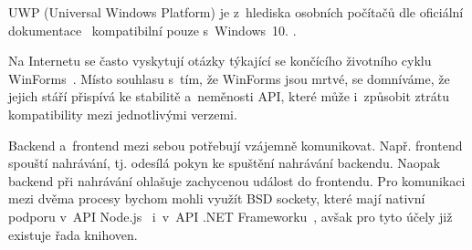 \documentclass[12pt, a4paper, twoside]{article}
\begin{document}
\begin{enumerate}[leftmargin=*]
{			UWP (Universal Windows Platform) je z~hlediska osobních počítačů dle oficiální dokumentace~\cite{uwpSupportedPlatforms} kompatibilní pouze s~Windows~10.
		}. 
		
		
		Na Internetu se často vyskytují otázky týkající se končícího životního cyklu WinForms~\cite{winformObselote1,winformsObselote2,winformsObselote3, winformsObselote4, winformsObselote5}. Místo souhlasu s~tím, že WinForms jsou mrtvé, se domníváme, že jejich stáří přispívá ke stabilitě a~neměnosti API, které může i~způsobit ztrátu kompatibility mezi jednotlivými verzemi.
		
	\end{enumerate}
	Backend a~frontend mezi sebou potřebují vzájemně komunikovat. Např. frontend spouští nahrávání, tj. odesílá pokyn ke spuštění nahrávání backendu. Naopak backend při nahrávání ohlašuje zachycenou událost do frontendu. Pro komunikaci mezi dvěma procesy bychom mohli využít BSD sockety, které mají nativní podporu v~API Node.js~\cite{nodejsApi} i~v~API .NET Frameworku~\cite{dotnetApi}, avšak pro tyto účely již existuje řada knihoven. 
	
\end{document}
